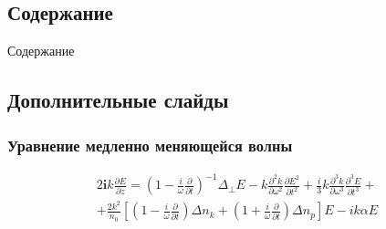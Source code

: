 \documentclass[fullscreen=true,unicode,bookmarks=true,colorlinks,urlcolor=blue,unicode]{beamer}
\begin{document}
	\subsection{Содержание}	
	
	\begin{frame}{Содержание}
		\vspace{1.0em}
		{\scriptsize \tableofcontents}
	\end{frame}

	\subsection{Дополнительные слайды}

	\begin{frame}
		\frametitle{Уравнение медленно меняющейся волны}
		
		\begin{eqnarray}
			2\textbf{i}k\frac{\partial E}{\partial z} =
			\left( 1-\frac{i}{\omega}\frac{\partial}{\partial t}\right)^{-1}\Delta_{\perp}E -
			k\frac{\partial^2 k}{\partial \omega^2}\frac{\partial E^2}{\partial t^2} +
			\frac{i}{3}k\frac{\partial^3 k}{\partial \omega^3}\frac{\partial^3 E}{\partial t^3} +  \nonumber \\
			+ \frac{2k^2}{n_0}\left[
				\left( 1-\frac{i}{\omega}\frac{\partial}{\partial t}\right)\Delta n_k +
				\left( 1+\frac{i}{\omega}\frac{\partial}{\partial t}\right)\Delta n_p
			\right] E  - i k \alpha E  \nonumber
		\end{eqnarray}
	\end{frame}
\end{document}
